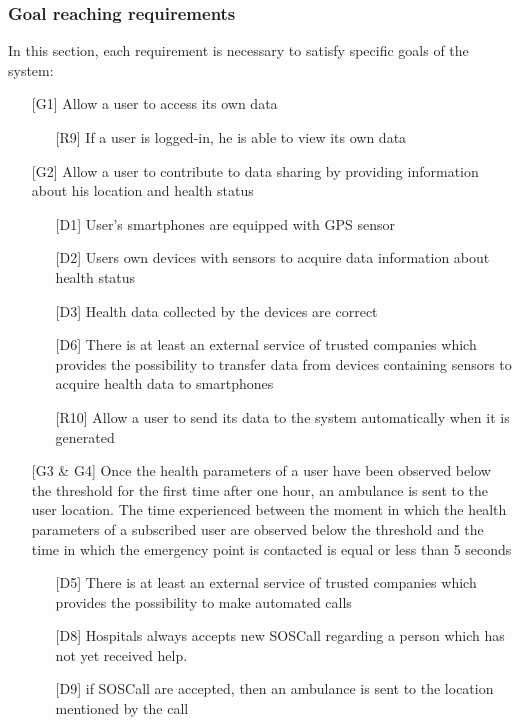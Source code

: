 \subsubsection{Goal reaching requirements}
\par
In this section, each requirement is necessary to satisfy specific goals of the system:
\begin{itemize}
\item[{[G1]}] Allow a user to access its own data
	\begin{itemize}
	\item[{[R9]}] If a user is logged-in, he is able to view its own data
	\end{itemize}
\item[{[G2]}] Allow a user to contribute to data sharing by providing information about his location and health status
	\begin{itemize}
	\item[{[D1]}]  User's smartphones are equipped with GPS sensor
	\item[{[D2]}] Users own devices with sensors to acquire data information about health status
	\item[{[D3]}] Health data collected by the devices are correct
	\item[{[D6]}] There is at least an external service of trusted companies which provides the possibility to transfer data from devices containing sensors to acquire health data to smartphones
	\item[{[R10]}] Allow a user to send its data to the system automatically when it is generated
	\end{itemize}
\item[{[G3 \& G4]}] Once the health parameters of a user have been observed 
below the threshold for the first time after one hour, an ambulance is sent to the user location. 
The time experienced between the moment in which the health parameters of a subscribed user are observed below the threshold and the time in which the emergency point is contacted is equal or less than 5 seconds
	\begin{itemize}
	\item[{[D5]}] There is at least an external service of trusted companies which provides the possibility to make automated calls
	\item[{[D8]}] Hospitals always accepts new SOSCall regarding a person which has not yet received help.
	\item[{[D9]}] if SOSCall are accepted, then an ambulance is sent to the location mentioned by the call

\end{itemize}
\end{itemize}
